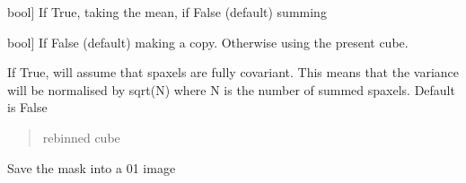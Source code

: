 \documentclass[letterpaper,10pt,english]{sphinxmanual}
\begin{document}
\begin{fulllineitems}
\begin{fulllineitems}
\begin{description}
\sphinxlineitem{mean}{[}bool{]}
\sphinxAtStartPar
If True, taking the mean, if False (default) summing

\sphinxlineitem{inplace}{[}bool{]}
\sphinxAtStartPar
If False (default) making a copy. Otherwise using the present cube.

\sphinxAtStartPar
If True, will assume that spaxels are fully covariant. This means that
the variance will be normalised by sqrt(N) where N is the number of
summed spaxels. Default is False

\end{description}
\begin{quote}\begin{description}
\sphinxAtStartPar
{}

\sphinxAtStartPar
rebinned cube

\end{description}\end{quote}

\end{fulllineitems}


\begin{fulllineitems}
\label{\detokenize{api/pymusepipe:pymusepipe.mpdaf_pipe.MuseCube.save_mask}}
\pysigstartsignatures
{}
\pysigstopsignatures
\sphinxAtStartPar
Save the mask into a 0\sphinxhyphen{}1 image

\end{fulllineitems}


\end{fulllineitems}

\end{document}
